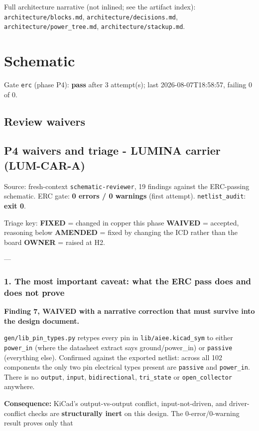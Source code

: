 \documentclass[11pt,a4paper]{article}
\begin{document}
Full architecture narrative (not inlined; see the artifact index): \texttt{architecture/blocks.md}, \texttt{architecture/decisions.md}, \texttt{architecture/power\_tree.md}, \texttt{architecture/stackup.md}.
\section{Schematic}
Gate \texttt{erc} (phase P4): \textbf{pass} after 3 attempt(s); last 2026-08-07T18:58:57, failing 0 of 0.
\subsection*{Review waivers}
\subsection*{P4 waivers and triage - LUMINA carrier (LUM-CAR-A)}
Source: fresh-context \texttt{schematic-reviewer}, 19 findings against the ERC-passing schematic. ERC gate: \textbf{0 errors / 0 warnings} (first attempt). \texttt{netlist\_audit}: \textbf{exit 0}.

Triage key: \textbf{FIXED} = changed in copper this phase \textbar{} \textbf{WAIVED} = accepted, reasoning below \textbar{} \textbf{AMENDED} = fixed by changing the ICD rather than the board \textbar{} \textbf{OWNER} = raised at H2.

---

\subsubsection*{1. The most important caveat: what the ERC pass does and does not prove}
\textbf{Finding 7, WAIVED with a narrative correction that must survive into the design document.}

\texttt{gen/lib\_pin\_types.py} retypes every pin in \texttt{lib/aiee.kicad\_sym} to either \texttt{power\_in} (where the datasheet extract says ground/power\_in) or \texttt{passive} (everything else). Confirmed against the exported netlist: across all 102 components the only two pin electrical types present are \texttt{passive} and \texttt{power\_in}. There is no \texttt{output}, \texttt{input}, \texttt{bidirectional}, \texttt{tri\_state} or \texttt{open\_collector} anywhere.

\textbf{Consequence:} KiCad's output-vs-output conflict, input-not-driven, and driver-conflict checks are \textbf{structurally inert} on this design. The 0-error/0-warning result proves only that
\end{document}
